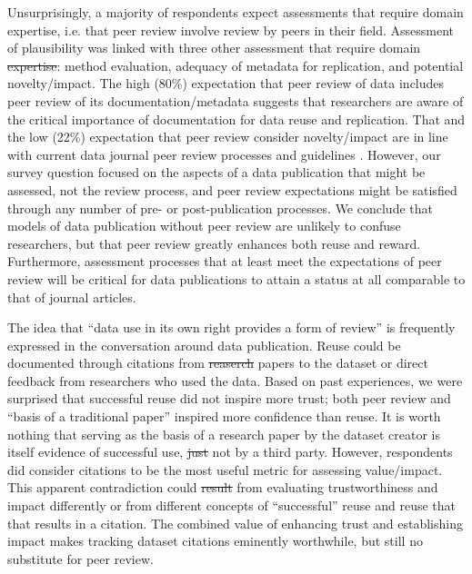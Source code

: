 \documentclass[10pt]{article}
\providecommand{\DIFaddtex}[1]{{\protect\color{blue}\uwave{#1}}} %
\providecommand{\DIFdeltex}[1]{{\protect\color{red}\sout{#1}}}                      %
\providecommand{\DIFaddbegin}{} %
\providecommand{\DIFaddend}{} %
\providecommand{\DIFdelbegin}{} %
\providecommand{\DIFdelend}{} %
\providecommand{\DIFadd}[1]{\texorpdfstring{\DIFaddtex{#1}}{#1}} %
\providecommand{\DIFdel}[1]{\texorpdfstring{\DIFdeltex{#1}}{}} %
\begin{document}
Unsurprisingly, a majority of respondents expect assessments that require domain expertise, i.e. that peer review involve review by peers in their field.
Assessment of plausibility was linked with three other assessment that require domain \DIFdelbegin \DIFdel{expertise}\DIFdelend \DIFaddbegin \DIFadd{knowledge}\DIFaddend : method evaluation, adequacy of metadata for replication, and potential novelty/impact.
The high (80\%) expectation that peer review of data includes peer review of its documentation/metadata suggests that researchers are aware of the critical importance of documentation for data reuse and replication.
That and the low (22\%) expectation that peer review consider novelty/impact are in line with current data journal peer review processes and guidelines \cite{kratz_data_2014}.
However, our survey question focused on the aspects of a data publication that might be assessed, not the review process, and peer review expectations might be satisfied through any number of pre- or post-publication processes.
We conclude that models of data publication without peer review are unlikely to confuse researchers, but that peer review greatly enhances both reuse and reward.
Furthermore, assessment processes that at least meet the expectations of peer review will be critical for data publications to attain a status at all comparable to that of journal articles.

The idea that ``data use in its own right provides a form of review'' \cite{parsons_data_2010} is frequently expressed in the conversation around data publication. 
Reuse could be documented through citations from \DIFdelbegin \DIFdel{reaserch }\DIFdelend \DIFaddbegin \DIFadd{research }\DIFaddend papers to the dataset or direct feedback from researchers who used the data.
Based on past experiences, we were surprised that successful reuse did not inspire more trust; both peer review and ``basis of a traditional paper'' inspired \DIFaddbegin \DIFadd{slightly }\DIFaddend more confidence than reuse.
It is worth nothing that serving as the basis of a research paper by the dataset creator is itself evidence of successful use, \DIFdelbegin \DIFdel{just }\DIFdelend \DIFaddbegin \DIFadd{albeit }\DIFaddend not by a third party.
However, respondents did consider citations to be the most useful metric for assessing value/impact.
This apparent contradiction could \DIFdelbegin \DIFdel{result }\DIFdelend \DIFaddbegin \DIFadd{stem }\DIFaddend from evaluating trustworthiness and impact differently or from different concepts of  ``successful'' reuse and reuse that that results in a citation.
The combined value of enhancing trust and establishing impact makes tracking dataset citations eminently worthwhile, but still no substitute for peer review.
\end{document}
